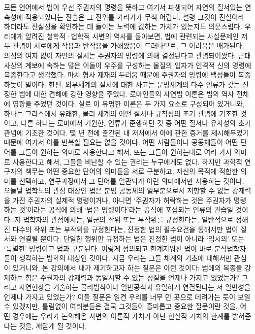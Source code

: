 모든 언어에서 법이 우선 주권자의 명령을 뜻하고
여기서 파생되어 자연의 질서있는 연속성에 적용되었다는 진술은
그 진위를 가리기가 무척 어렵다.
설령 그것이 진실이라 하더라도 진실성을 확인하는 데 들이는
노력에 값하는 가치가 있는지도 의문스럽다.
우리에게 알려진 철학적·법학적 사변의 역사를 돌아보면,
법에 관련되는 사실문제인 저 두 관념이 서로에게 작용과 반작용을 가해왔음이
드러나므로, 그 어려움은 배가된다.
의심의 여지 없이
자연의 질서는 주권자의 명령에 의해 결정된다고 관념되어왔다.
근대사상의 계보에 속하는 많은 이들이
우주를 구성하는 물질의 입자가 인격적 신의 명령에 복종한다고 생각했다.
마치 형사 제재의 두려움 때문에 주권자의 명령에 백성들이 복종하듯이 말이다.
한편,
외부세계의 질서에 대한 사고는
문명세계의 다수 인류가 갖는 진정한 법에 대한 견해에 강한 영향을 주었다.
로마인들의 자연법 이론은
법의 역사 전체에 영향을 주었던 것이다.
실로 이 유명한 이론은 두 가지 요소로 구성되어 있거니와,
하나는 그리스에서 유래한,
물리 세계의 어떤 질서나 규칙성의 초기 관념에 기초한 것이고,
다른 하나는 로마에서 기원한,
인류가 준행하던 것 중 어떤 질서나 유사성의 초기 관념에 기초한 것이다.
몇 년 전에 출간된 내 저서에서 이에 관한 증거를 제시해두었기 때문에
여기서 이를 반복할 필요는 없을 것이다.
어떤 사람들이나 공동체들이 어떤 단어를 그들이 원하는 의미로 사용한다고 해서,
또는 그들이 원하는대로 여러 가지 의미로 사용한다고 해서,
그들을 비난할 수 있는 권리는 누구에게도 없다.
하지만 과학적 연구자의 책무는
어떤 중요한 단어의 의미들을 서로 구분하고,
자신의 목적에 적합한 의미를 선택하고,
연구과정에서 그 단어를 일관되게 이런 의미에서만 사용하는 것이다.
오늘날 법학도의 관심 대상인 법은
분명
공동체의 일부분으로서 저항할 수 없는 강제력을 가진
주권자의 실제적 명령이거나, 아니면
`주권자가 허락하는 것은 주권자가 명령하는 것'이라는 공식에 의해
`법은 명령이다'라는 공식에 포섭되는 인류의 관습일 것이다.
저 법학자의 관점에서는,
일군의 작위 또는 부작위를 규정한다는,
일반적으로 정해진 다수의 작위 또는 부작위를 규정한다는,
진정한 법의 필수요건을 통해서만 법이 질서와 연결될 뿐이다.
단일한 행위만 규정하는 법은 진정한 법이 아니라
`임시의' 또는 `특별한' 명령이고 법과 구분된다.
이렇게 정의되고 한계지워진 법이 바로 분석법학자들이 생각하는
법학의 대상인 것이다.
지금 우리는 그들 체계의 기초에 대해서만 관심이 있거니와,
본 강의에서 내가 제기하고자 하는 질문은 이런 것이다:
법에의 복종을 강제하는 힘은
주권자의 강제력과 동일시할 수 있는 성질을 언제나 가지고 있었는가?
그리고 자연현상을 기술하는 물리법칙이나 일반공식과 유일하게 연결된다는
저 일반성을 언제나 가지고 있었는가?
이들 질문은 일견 우리를 너무 먼 곳으로 데려가는 듯이 보일 수 있겠지만,
틀림없이 여러분들은 결국 그것들이 흥미롭고 중요한 질문이란 것을,
어떤 경우에는 우리가 논의해온 사변의 이론적 가치가 아닌
현실적 가치의 한계를 밝혀준다는 것을,
깨닫게 될 것이다.

